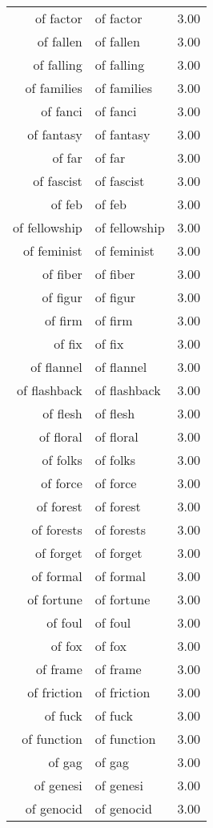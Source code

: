 \begin{table}[ht]
\begin{tabular}{rlr}
  of factor & of factor & 3.00 \\ 
  of fallen & of fallen & 3.00 \\ 
  of falling & of falling & 3.00 \\ 
  of families & of families & 3.00 \\ 
  of fanci & of fanci & 3.00 \\ 
  of fantasy & of fantasy & 3.00 \\ 
  of far & of far & 3.00 \\ 
  of fascist & of fascist & 3.00 \\ 
  of feb & of feb & 3.00 \\ 
  of fellowship & of fellowship & 3.00 \\ 
  of feminist & of feminist & 3.00 \\ 
  of fiber & of fiber & 3.00 \\ 
  of figur & of figur & 3.00 \\ 
  of firm & of firm & 3.00 \\ 
  of fix & of fix & 3.00 \\ 
  of flannel & of flannel & 3.00 \\ 
  of flashback & of flashback & 3.00 \\ 
  of flesh & of flesh & 3.00 \\ 
  of floral & of floral & 3.00 \\ 
  of folks & of folks & 3.00 \\ 
  of force & of force & 3.00 \\ 
  of forest & of forest & 3.00 \\ 
  of forests & of forests & 3.00 \\ 
  of forget & of forget & 3.00 \\ 
  of formal & of formal & 3.00 \\ 
  of fortune & of fortune & 3.00 \\ 
  of foul & of foul & 3.00 \\ 
  of fox & of fox & 3.00 \\ 
  of frame & of frame & 3.00 \\ 
  of friction & of friction & 3.00 \\ 
  of fuck & of fuck & 3.00 \\ 
  of function & of function & 3.00 \\ 
  of gag & of gag & 3.00 \\ 
  of genesi & of genesi & 3.00 \\ 
  of genocid & of genocid & 3.00 \\ 

\end{tabular}
\end{table}
